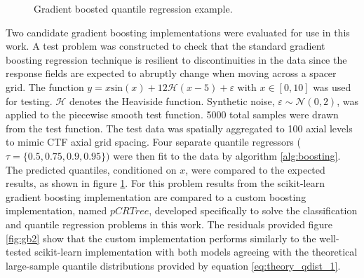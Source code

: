 \begin{figure}[H]
    \caption[Gradient boosted quantile regression example.]{Gradient boosted quantile regression example.}%
    \label{fig:gb1}%
\end{figure}

Two candidate gradient boosting implementations were evaluated for use in this work.  A test problem was constructed to check that the standard gradient boosting regression technique is resilient to discontinuities in the data since the response fields are expected to abruptly change when moving across a spacer grid.  The function $y = x \mathrm{sin}(x) +12 \mathcal H(x-5)+\varepsilon$ with $x\in [0,10]$ was used for testing.  $\mathcal H$ denotes the Heaviside function. Synthetic noise, $\varepsilon \sim \mathcal N(0,2)$, was applied to the piecewise smooth test function.   5000 total samples were drawn from the test function. The test data was spatially aggregated to 100 axial levels to mimic CTF axial grid spacing.  Four separate quantile regressors ($\tau = \{0.5, 0.75, 0.9, 0.95 \})$ were then fit to the data by algorithm \ref{alg:boosting}. The predicted quantiles, conditioned on $x$, were compared to the expected results, as shown in figure \ref{fig:gb1}. For this problem results from the scikit-learn gradient boosting implementation are compared to a custom boosting implementation, named $pCRTree$, developed specifically to solve the classification and quantile regression problems in this work.  The residuals provided figure \ref{fig:gb2} show that the custom implementation performs similarly to the well-tested scikit-learn implementation with both models agreeing with the theoretical large-sample quantile distributions provided by equation \ref{eq:theory_qdist_1}.

